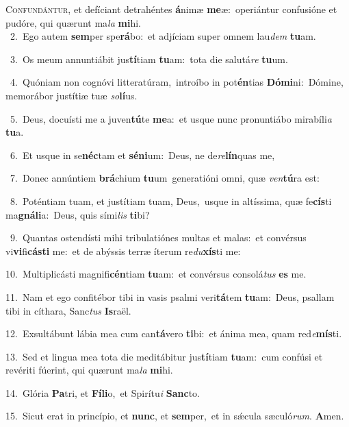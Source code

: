 \lettrine{\initial\textcolor{\initialcolor}{C}}{onfundántur,} et defíciant detrahéntes \textbf{á}\-nimæ \textbf{me}\-æ:~\star operiántur confusióne et pudóre, qui quærunt ma\textit{la} \textbf{mi}\-hi.\\
{\numbfont\textcolor{\numbcolor}{~2.}}~Ego autem \textbf{sem}\-per spe\-\textbf{rá}\-bo:~\star et adjíciam super omnem lau\textit{dem} \textbf{tu}\-am.\par
{\numbfont\textcolor{\numbcolor}{~3.}}~Os meum annuntiábit jus\-\textbf{tí}\-tiam \textbf{tu}\-am:~\star tota die salutá\textit{re} \textbf{tu}\-um.\par
{\numbfont\textcolor{\numbcolor}{~4.}}~Quóniam non cognóvi litteratúram,~\dagger introíbo in pot\-\textbf{én}\-tias \textbf{Dó}\-\textbf{mi}ni:~\star Dómine, memorábor justítiæ tuæ \textit{so}\-\textbf{lí}us.\par
{\numbfont\textcolor{\numbcolor}{~5.}}~Deus, docuísti me a juven\-\textbf{tú}\-te \textbf{me}\-a:~\star et usque nunc pronuntiábo mirabíli\textit{a} \textbf{tu}\-a.\par
{\numbfont\textcolor{\numbcolor}{~6.}}~Et usque in se\-\textbf{néc}\-tam et \textbf{sé}\-\textbf{ni}um:~\star Deus, ne de\-\textit{re}\-\textbf{lín}quas me,\par
{\numbfont\textcolor{\numbcolor}{~7.}}~Donec annúntiem \textbf{brá}\-chium \textbf{tu}\-um~\star generatióni omni, quæ \textit{ven}\-\textbf{tú}ra est:\par
{\numbfont\textcolor{\numbcolor}{~8.}}~Poténtiam tuam, et justítiam tuam, Deus,~\dagger usque in altíssima, quæ fe\-\textbf{cís}\-ti ma\-\textbf{gná}\-\textbf{li}a:~\star Deus, quis sími\textit{lis} \textbf{ti}\-bi?\par
{\numbfont\textcolor{\numbcolor}{~9.}}~Quantas ostendísti mihi tribulatiónes multas et malas:~\dagger et convérsus vi\-\textbf{vi}\-fi\-\textbf{cás}\-\textbf{ti} me:~\star et de abýssis terræ íterum re\-\textit{du}\-\textbf{xís}ti me:\par
{\numbfont\textcolor{\numbcolor}{10.}}~Multiplicásti magnifi\-\textbf{cén}\-tiam \textbf{tu}\-am:~\star et convérsus consolá\textit{tus} \textbf{es} me.\par
{\numbfont\textcolor{\numbcolor}{11.}}~Nam et ego confitébor tibi in vasis psalmi veri\-\textbf{tá}\-tem \textbf{tu}\-am:~\star Deus, psallam tibi in cíthara, Sanc\textit{tus} \textbf{Is}\-raël.\par
{\numbfont\textcolor{\numbcolor}{12.}}~Exsultábunt lábia mea cum can\-\textbf{tá}\-vero \textbf{ti}\-bi:~\star et ánima mea, quam red\-\textit{e}\-\textbf{mís}ti.\par
{\numbfont\textcolor{\numbcolor}{13.}}~Sed et lingua mea tota die meditábitur jus\-\textbf{tí}\-tiam \textbf{tu}\-am:~\star cum confúsi et revériti fúerint, qui quærunt ma\textit{la} \textbf{mi}\-hi.\par
{\numbfont\textcolor{\numbcolor}{14.}}~Glória \textbf{Pa}\-tri, et \textbf{Fí}\-\textbf{li}o,~\star et Spirítu\textit{i} \textbf{Sanc}\-to.\par
{\numbfont\textcolor{\numbcolor}{15.}}~Sicut erat in princípio, et \textbf{nunc}\-, et \textbf{sem}\-per,~\star et in sǽcula sæculó\-\textit{rum}\-. \textbf{A}\-men.\par
